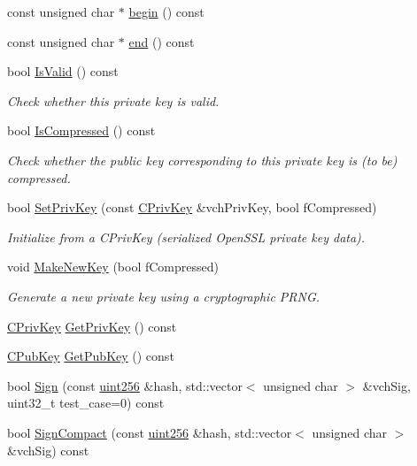 \begin{DoxyCompactItemize}
const unsigned char $\ast$ \hyperlink{class_c_key_aabd29e0d5faf30032cc8519a1ce62a5a}{begin} () const 
\item 
const unsigned char $\ast$ \hyperlink{class_c_key_a651d1e10b4085da5e4c4a764f3a384df}{end} () const 
\item 
bool \hyperlink{class_c_key_a62094263b7422a45b45ac508396f19eb}{Is\+Valid} () const 
\begin{DoxyCompactList}\small\item\em Check whether this private key is valid. \end{DoxyCompactList}\item 
bool \hyperlink{class_c_key_abdc7d807f7a1b27ff3ad9dd5164a2273}{Is\+Compressed} () const 
\begin{DoxyCompactList}\small\item\em Check whether the public key corresponding to this private key is (to be) compressed. \end{DoxyCompactList}\item 
bool \hyperlink{class_c_key_aa62c082c9037565fce02b457cc335e7b}{Set\+Priv\+Key} (const \hyperlink{key_8h_a1da569b8b6e5b3fa1196cc1b877e7f54}{C\+Priv\+Key} \&vch\+Priv\+Key, bool f\+Compressed)
\begin{DoxyCompactList}\small\item\em Initialize from a C\+Priv\+Key (serialized Open\+S\+S\+L private key data). \end{DoxyCompactList}\item 
void \hyperlink{class_c_key_a9d12ed9d297e4286250fd7ea6b59e1a5}{Make\+New\+Key} (bool f\+Compressed)
\begin{DoxyCompactList}\small\item\em Generate a new private key using a cryptographic P\+R\+N\+G. \end{DoxyCompactList}\item 
\hyperlink{key_8h_a1da569b8b6e5b3fa1196cc1b877e7f54}{C\+Priv\+Key} \hyperlink{class_c_key_ab38813e7091f658612dfb14f17c9e317}{Get\+Priv\+Key} () const 
\item 
\hyperlink{class_c_pub_key}{C\+Pub\+Key} \hyperlink{class_c_key_ae4b61da6ec62f676fe6362ac5fc26aca}{Get\+Pub\+Key} () const 
\item 
bool \hyperlink{class_c_key_a3b161899b4fa79f5a7036d2ccf12ce3a}{Sign} (const \hyperlink{classuint256}{uint256} \&hash, std\+::vector$<$ unsigned char $>$ \&vch\+Sig, uint32\+\_\+t test\+\_\+case=0) const 
\item 
bool \hyperlink{class_c_key_a59afeabf3f63d99dfdbd3722087853a1}{Sign\+Compact} (const \hyperlink{classuint256}{uint256} \&hash, std\+::vector$<$ unsigned char $>$ \&vch\+Sig) const 

\end{DoxyCompactItemize}
